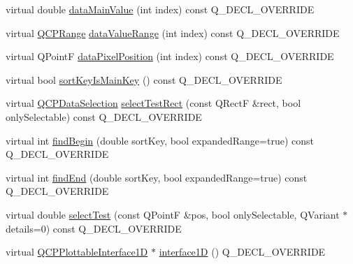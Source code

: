 \begin{DoxyCompactItemize}
\item 
virtual double \hyperlink{classQCPErrorBars_ae9f6c79c03147efb1a67742c55386dc8}{data\+Main\+Value} (int index) const Q\+\_\+\+D\+E\+C\+L\+\_\+\+O\+V\+E\+R\+R\+I\+DE
\item 
virtual \hyperlink{classQCPRange}{Q\+C\+P\+Range} \hyperlink{classQCPErrorBars_af71af55d929d832daf32e283b21e1f3e}{data\+Value\+Range} (int index) const Q\+\_\+\+D\+E\+C\+L\+\_\+\+O\+V\+E\+R\+R\+I\+DE
\item 
virtual Q\+PointF \hyperlink{classQCPErrorBars_ae79fed6566f1912a97344b20b35faac1}{data\+Pixel\+Position} (int index) const Q\+\_\+\+D\+E\+C\+L\+\_\+\+O\+V\+E\+R\+R\+I\+DE
\item 
virtual bool \hyperlink{classQCPErrorBars_af75958b95d9b9c7edfd9851c1d123850}{sort\+Key\+Is\+Main\+Key} () const Q\+\_\+\+D\+E\+C\+L\+\_\+\+O\+V\+E\+R\+R\+I\+DE
\item 
virtual \hyperlink{classQCPDataSelection}{Q\+C\+P\+Data\+Selection} \hyperlink{classQCPErrorBars_ad7c727736599dfb173f0952082e1a5b6}{select\+Test\+Rect} (const Q\+RectF \&rect, bool only\+Selectable) const Q\+\_\+\+D\+E\+C\+L\+\_\+\+O\+V\+E\+R\+R\+I\+DE
\item 
virtual int \hyperlink{classQCPErrorBars_a74c57d6abb8eda3c4c31b72d1df9f568}{find\+Begin} (double sort\+Key, bool expanded\+Range=true) const Q\+\_\+\+D\+E\+C\+L\+\_\+\+O\+V\+E\+R\+R\+I\+DE
\item 
virtual int \hyperlink{classQCPErrorBars_ad22dd8499c6d45176ad0651751a0b0b0}{find\+End} (double sort\+Key, bool expanded\+Range=true) const Q\+\_\+\+D\+E\+C\+L\+\_\+\+O\+V\+E\+R\+R\+I\+DE
\item 
virtual double \hyperlink{classQCPErrorBars_ac1b6675ef43e32547a3cbcf7b7ac46ed}{select\+Test} (const Q\+PointF \&pos, bool only\+Selectable, Q\+Variant $\ast$details=0) const Q\+\_\+\+D\+E\+C\+L\+\_\+\+O\+V\+E\+R\+R\+I\+DE
\item 
virtual \hyperlink{classQCPPlottableInterface1D}{Q\+C\+P\+Plottable\+Interface1D} $\ast$ \hyperlink{classQCPErrorBars_a0b6fbf3a943b4241ee485d066cc8562a}{interface1D} () Q\+\_\+\+D\+E\+C\+L\+\_\+\+O\+V\+E\+R\+R\+I\+DE
\end{DoxyCompactItemize}
